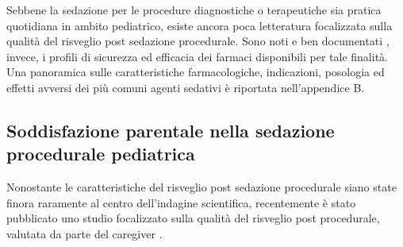 Sebbene la sedazione per le procedure diagnostiche o terapeutiche sia pratica quotidiana in ambito pediatrico, esiste ancora poca letteratura focalizzata sulla qualità del risveglio post sedazione procedurale. Sono noti e ben documentati \citep{Bellolio2016, Hartlin2016}, invece, i profili di sicurezza ed efficacia dei farmaci disponibili per tale finalità. Una panoramica sulle caratteristiche farmacologiche, indicazioni, posologia ed effetti avversi dei più comuni agenti sedativi è riportata nell'appendice B. %

\bigskip

\subsection*{Soddisfazione parentale nella sedazione procedurale pediatrica}
Nonostante le caratteristiche del risveglio post sedazione procedurale siano state finora raramente al centro dell'indagine scientifica, recentemente è stato pubblicato uno studio focalizzato sulla qualità del risveglio post procedurale, valutata da parte del caregiver \cite{Cortellazzo2022}. %

